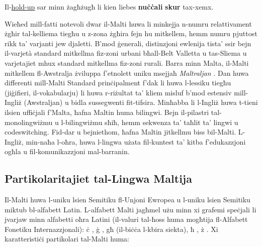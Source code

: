 \begin{multicols}{2}
\begin{examples}
\item Il-\underline{hold-up} sar minn żagħżugħ li kien liebes \textbf{nuċċali} \textbf{skur} tax-xemx.
\end{examples}


Wieħed mill-fatti notevoli dwar il-Malti huwa li minkejja n-numru relattivament żgħir tal-kelliema tiegħu u z-zona żgħira fejn hu mitkellem, hemm numru pjuttost rikk ta’ varjanti jew djaletti. B’mod ġenerali, distinzjoni ewlenija tista’ ssir bejn il-varjetà standard mitkellma fiz-zoni urbani bħall-Belt Valletta u tas-Sliema u varjetajiet mhux standard mitkellma fiz-zoni rurali. Barra minn Malta, il-Malti mitkellem fl-Awstralja żviluppa f’etnolett uniku msejjaħ \emph{Maltraljan} \cite{Bovingdon:2001}. Dan huwa differenti mill-Malti Standard prinċipalment f'dak li huwa l-lessiku tiegħu (jiġifieri, il-vokabularju) li huwa r-riżultat ta’ kliem misluf b’mod estensiv mill- Ingliż (Awstraljan) u bidla sussegwenti fit-tifsira. 
Minħabba li l-Ingliż huwa t-tieni ilsien uffiċjali f'Malta, ħafna Maltin huma bilingwi. Bejn il-pilastri tal-monolingwiżmu u l-bilingwiżmu sħiħ, hemm sekwenza ta’ taħlit ta’ lingwi u codeswitching. Fid-dar u bejniethom, ħafna Maltin jitkellmu biss bil-Malti. L-Ingliż, min-naħa l-oħra, huwa l-lingwa użata fil-kuntest ta’ kitba f’edukazzjoni ogħla u fil-komunikazzjoni mal-barranin.

\subsection{Partikolaritajiet tal-Lingwa Maltija}

Il-Malti huwa l-uniku lsien Semitiku fl-Unjoni Ewropea u l-uniku lsien Semitiku miktub bl-alfabett Latin. L-alfabett Malti jagħmel użu minn xi grafemi speċjali li jvarjaw minn alfabetti oħra Latini (il-valuri tal-ħoss huma mogħtija fl-Alfabett Fonetiku Internazzjonali): 
ċ , ġ , għ (il-biċċa l-kbira siekta), ħ , ż  \cite{Fabri:2011a,Borg-Alexander:1997}.
Xi karatteristiċi partikolari tal-Malti huma:


\end{multicols}
